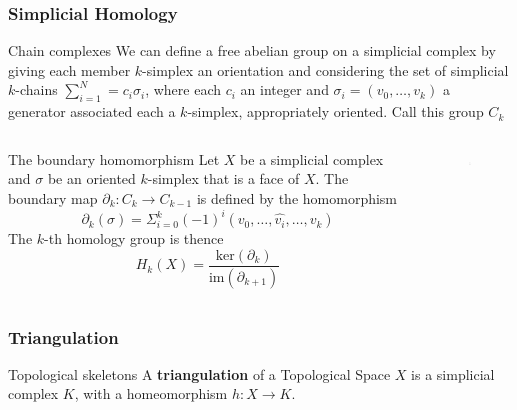 \documentclass{beamer}
\theoremstyle{definition}
\numberwithin{theorem}{section}
\begin{document}
\begin{frame}[t]
\frametitle{Simplicial Homology}

\begin{block}{Chain complexes}
\scriptsize
We can define a free abelian group on a simplicial complex by giving each member $k$-simplex an orientation and considering the set of simplicial $k$-chains $\sum^{N}_{i=1} = c_i\sigma_i$, where each $c_i$ an integer and $\sigma_i = (v_0, \hdots, v_k)$ a generator associated each a $k$-simplex, appropriately oriented. Call this group $C_k$ 
\end{block}
\begin{columns}[t]
\begin{column}{0.4\textwidth}
\begin{block}{The boundary homomorphism}
\tiny
Let $X$ be a simplicial complex and $\sigma$ be an oriented $k$-simplex that is a face of $X$. The boundary map $\partial _k: C_k \rightarrow C_{k-1}$ is defined by the homomorphism $$\partial_k(\sigma) = \Sigma_{i=0}^k (-1)^i (v_0, \hdots, \hat{v_i}, \hdots, v_k)$$ 
The $k$-th homology group is thence $$H_k(X) = \frac{\textrm{ker}(\partial_{k})}{\textrm{im}(\partial_{k+1})}$$ 
\end{block}
\end{column}
\begin{column}{0.4\textwidth}
	\begin{figure}
		\includegraphics[width = 4cm]{img670.png}
	\end{figure}
\end{column}
\end{columns}
\end{frame}



\begin{frame}
\frametitle{Triangulation}
\begin{block}{Topological skeletons}
A \textbf{triangulation} of a Topological Space $X$ is a simplicial complex $K$, with a homeomorphism $h : X \rightarrow K$. 
\end{block}

\end{frame}
\end{document}
